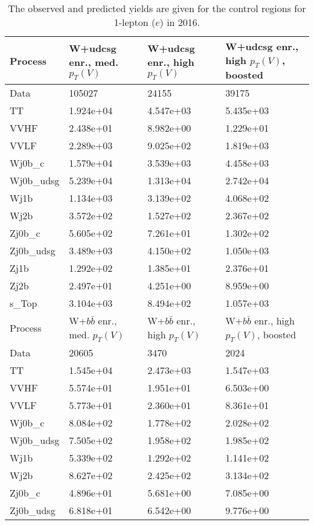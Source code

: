 \begin{table}
\centering
\caption[2016 1-lepton ($e$) control region yields]{
                  The observed and predicted yields are given for the
                  control regions for 1-lepton ($e$) in 2016.
                  }
{\footnotesize
\begin{tabularx}{0.8\textwidth}{|X|X|X|X|}
\hline
Process & W+udcsg enr., med. $p_{T}(V)$ & W+udcsg enr., high $p_{T}(V)$ & W+udcsg enr., high $p_{T}(V)$, boosted \\
\hline
Data & 105027 & 24155 & 39175 \\
\hline
TT & 1.924e+04 & 4.547e+03 & 5.435e+03 \\
VVHF & 2.438e+01 & 8.982e+00 & 1.229e+01 \\
VVLF & 2.289e+03 & 9.025e+02 & 1.819e+03 \\
Wj0b\_c & 1.579e+04 & 3.539e+03 & 4.458e+03 \\
Wj0b\_udsg & 5.239e+04 & 1.313e+04 & 2.742e+04 \\
Wj1b & 1.134e+03 & 3.139e+02 & 4.068e+02 \\
Wj2b & 3.572e+02 & 1.527e+02 & 2.367e+02 \\
Zj0b\_c & 5.605e+02 & 7.261e+01 & 1.302e+02 \\
Zj0b\_udsg & 3.489e+03 & 4.150e+02 & 1.050e+03 \\
Zj1b & 1.292e+02 & 1.385e+01 & 2.376e+01 \\
Zj2b & 2.497e+01 & 4.251e+00 & 8.959e+00 \\
s\_Top & 3.104e+03 & 8.494e+02 & 1.057e+03 \\
\hline
\hline
Process & W+$b\bar{b}$ enr., med. $p_{T}(V)$ & W+$b\bar{b}$ enr., high $p_{T}(V)$ & W+$b\bar{b}$ enr., high $p_{T}(V)$, boosted \\
\hline
Data & 20605 & 3470 & 2024 \\
\hline
TT & 1.545e+04 & 2.473e+03 & 1.547e+03 \\
VVHF & 5.574e+01 & 1.951e+01 & 6.503e+00 \\
VVLF & 5.773e+01 & 2.360e+01 & 8.361e+01 \\
Wj0b\_c & 8.084e+02 & 1.778e+02 & 2.028e+02 \\
Wj0b\_udsg & 7.505e+02 & 1.958e+02 & 1.985e+02 \\
Wj1b & 5.339e+02 & 1.292e+02 & 1.141e+02 \\
Wj2b & 8.627e+02 & 2.425e+02 & 3.134e+02 \\
Zj0b\_c & 4.896e+01 & 5.681e+00 & 7.085e+00 \\
Zj0b\_udsg & 6.818e+01 & 6.542e+00 & 9.776e+00 \\

\end{tabularx}}
\end{table}
